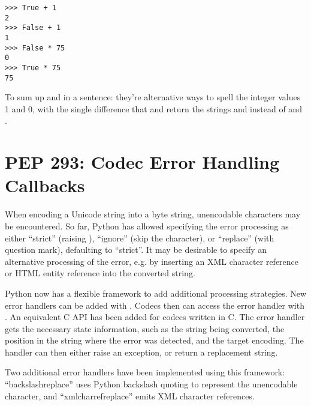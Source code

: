 \documentclass{howto}
\begin{document}
\begin{verbatim}
>>> True + 1
2
>>> False + 1
1
>>> False * 75
0
>>> True * 75
75
\end{verbatim}

To sum up  and  in a sentence: they're
alternative ways to spell the integer values 1 and 0, with the single
difference that  and  return the
strings  and  instead of  and
.

\begin{seealso}


\end{seealso}


\section{PEP 293: Codec Error Handling Callbacks}

When encoding a Unicode string into a byte string, unencodable
characters may be encountered.  So far, Python has allowed specifying
the error processing as either ``strict'' (raising
), ``ignore'' (skip the character), or
``replace'' (with question mark), defaulting to ``strict''. It may be
desirable to specify an alternative processing of the error, e.g. by
inserting an XML character reference or HTML entity reference into the
converted string.

Python now has a flexible framework to add additional processing
strategies.  New error handlers can be added with
. Codecs then can access the error
handler with . An equivalent C API has
been added for codecs written in C. The error handler gets the
necessary state information, such as the string being converted, the
position in the string where the error was detected, and the target
encoding.  The handler can then either raise an exception, or return a
replacement string.

Two additional error handlers have been implemented using this
framework: ``backslashreplace'' uses Python backslash quoting to
represent the unencodable character, and ``xmlcharrefreplace'' emits
XML character references.

\begin{seealso}


\end{seealso}
\end{document}
